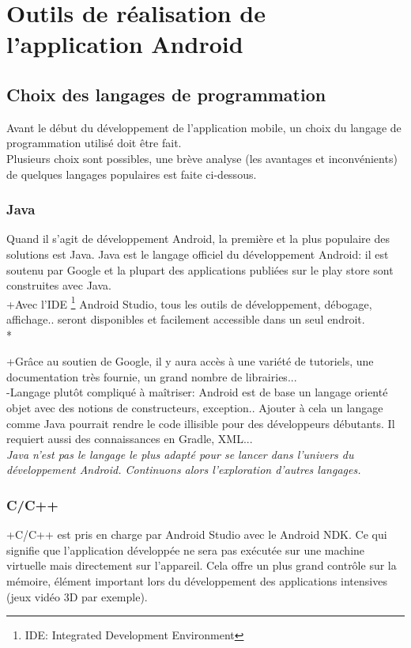 \documentclass{report}
\begin{document}
\section{Outils de réalisation de l'application Android}
\subsection{Choix des langages de programmation}
Avant le début du développement de l'application mobile, un choix du langage de programmation utilisé doit être fait.\\
Plusieurs choix sont possibles, une brève analyse (les avantages et inconvénients) de quelques langages populaires est faite ci-dessous.
\subsubsection{Java}
Quand il s'agit de développement Android, la première et la plus populaire des solutions est Java. Java est le langage officiel du développement Android: il est soutenu par Google et la plupart des applications publiées sur le play store sont construites avec Java.\\

+Avec l'IDE \footnote{IDE: Integrated Development Environment} Android Studio, tous les outils de développement, débogage, affichage.. seront disponibles et facilement accessible dans un seul endroit.\\*

+Grâce au soutien de Google, il y aura accès à une variété de tutoriels, une documentation très fournie, un grand nombre de librairies...\\

-Langage plutôt compliqué à maîtriser: Android est de base un langage orienté objet avec des notions de constructeurs, exception.. Ajouter à cela un langage comme Java pourrait rendre le code illisible pour des développeurs débutants. Il requiert aussi des connaissances en Gradle, XML...\\
\textit{Java n'est pas le langage le plus adapté pour se lancer dans l'univers du développement Android. Continuons alors l'exploration d'autres langages.}
\subsubsection{C/C++}
+C/C++ est pris en charge par Android Studio avec le Android NDK. Ce qui signifie que l'application développée ne sera pas exécutée sur une machine virtuelle mais directement sur l'appareil. Cela offre un plus grand contrôle sur la mémoire, élément important lors du développement des applications intensives (jeux vidéo 3D par exemple).\\
\end{document}

